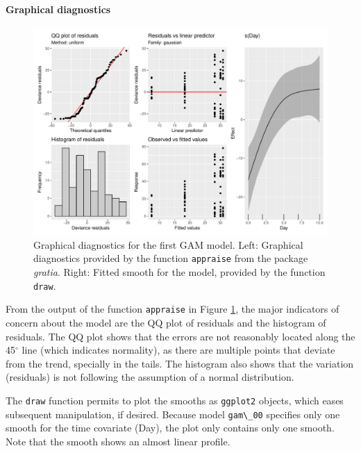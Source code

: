 \documentclass[
]{article}
\newcommand{\passthrough}[1]{#1}
\begin{document}
\hypertarget{graphical-diagnostics}{%
\paragraph{Graphical diagnostics}\label{graphical-diagnostics}}

\begin{figure}

{\centering \includegraphics[width=0.75\linewidth]{SIM_Appendix_files/figure-latex/first-GAM-diag-1} 

}

\caption{Graphical diagnostics for the first GAM model. Left: Graphical diagnostics provided by the function \passthrough{\lstinline!appraise!} from the package \emph{gratia}. Right: Fitted smooth for the model, provided by the function \passthrough{\lstinline!draw!}.}\label{fig:first-GAM-diag}
\end{figure}

From the output of the function \passthrough{\lstinline!appraise!} in Figure \ref{fig:first-GAM-diag}, the major indicators of concern about the model are the QQ plot of residuals and the histogram of residuals. The QQ plot shows that the errors are not reasonably located along the 45\(^{\circ}\) line (which indicates normality), as there are multiple points that deviate from the trend, specially in the tails. The histogram also shows that the variation (residuals) is not following the assumption of a normal distribution.

The \passthrough{\lstinline!draw!} function permits to plot the smooths as \passthrough{\lstinline!ggplot2!} objects, which eases subsequent manipulation, if desired. Because model \passthrough{\lstinline!gam\_00!} specifies only one smooth for the time covariate (Day), the plot only contains only one smooth. Note that the smooth shows an almost linear profile.
\end{document}
